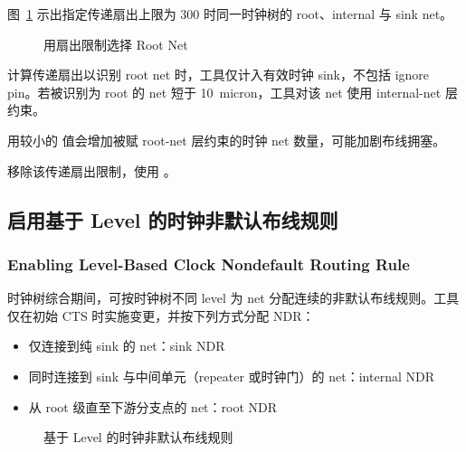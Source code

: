图~\ref{fig:ch2b-root-fanout} 示出指定传递扇出上限为 300 时同一时钟树的 root、internal 与 sink net。

\begin{figure}[htbp]
\centering
{}
\caption{用扇出限制选择 Root Net}
\label{fig:ch2b-root-fanout}
\end{figure}

计算传递扇出以识别 root net 时，工具仅计入有效时钟 sink，不包括 ignore pin。若被识别为 root 的 net 短于 10~micron，工具对该 net 使用 internal-net 层约束。

\begin{noteBox}
用较小的  值会增加被赋 root-net 层约束的时钟 net 数量，可能加剧布线拥塞。
\end{noteBox}

移除该传递扇出限制，使用 。

\subsection{启用基于 Level 的时钟非默认布线规则}
\subsubsection*{Enabling Level-Based Clock Nondefault Routing Rule}

时钟树综合期间，可按时钟树不同 level 为 net 分配连续的非默认布线规则。工具仅在初始 CTS 时实施变更，并按下列方式分配 NDR：
\begin{itemize}
  \item 仅连接到纯 sink 的 net：sink NDR
  \item 同时连接到 sink 与中间单元（repeater 或时钟门）的 net：internal NDR
  \item 从 root 级直至下游分支点的 net：root NDR
\end{itemize}

\begin{figure}[htbp]
\centering
{}
\caption{基于 Level 的时钟非默认布线规则}
\label{fig:ch2b-level-ndr}
\end{figure}

